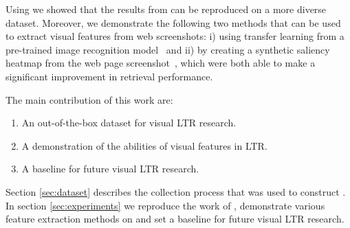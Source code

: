 Using \datasetname we showed that the results from \citet{fan2017learning} can be reproduced on a more diverse dataset. Moreover, we demonstrate the following two methods that can be used to extract visual features from web screenshots: i) using transfer learning from a pre-trained image recognition model~\cite{donahue2014decaf}\cite{simonyan2014very} and ii) by creating a synthetic saliency heatmap from the web page screenshot~\cite{shen2014webpage}\cite{shan2017two}, which were both able to make a significant improvement in retrieval performance. 

The main contribution of this work are:
\begin{enumerate}  
\item An out-of-the-box dataset for visual \ac{LTR} research.
\item A demonstration of the abilities of visual features in \ac{LTR}.
\item A baseline for future visual \ac{LTR} research.
\end{enumerate}

Section \ref{sec:dataset} describes the collection process that was used to construct \datasetname. In section \ref{sec:experiments} we reproduce the work of \citet{fan2017learning}, demonstrate various feature extraction methods on \datasetname and set a baseline for future visual \ac{LTR} research.  